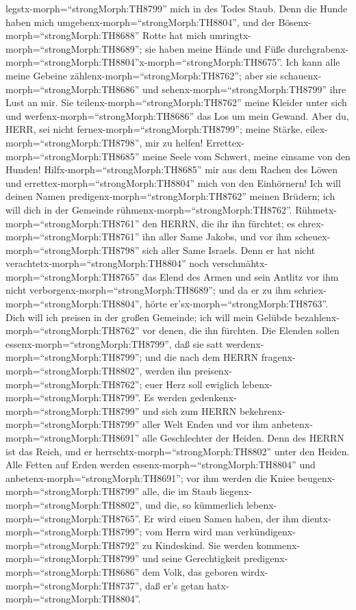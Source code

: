 legstx-morph=``strongMorph:TH8799'' mich in des Todes Staub.
 Denn die Hunde haben mich
umgebenx-morph=``strongMorph:TH8804'', und der
Bösenx-morph=``strongMorph:TH8688'' Rotte hat mich
umringtx-morph=``strongMorph:TH8689''; sie haben meine Hände und Füße
durchgrabenx-morph=``strongMorph:TH8804''\textbar x-morph=``strongMorph:TH8675''.
 Ich kann alle meine Gebeine
zählenx-morph=``strongMorph:TH8762''; aber sie
schauenx-morph=``strongMorph:TH8686'' und
sehenx-morph=``strongMorph:TH8799'' ihre Lust an mir.  Sie
teilenx-morph=``strongMorph:TH8762'' meine Kleider unter sich und
werfenx-morph=``strongMorph:TH8686'' das Los um mein Gewand.
 Aber du, HERR, sei nicht
fernex-morph=``strongMorph:TH8799''; meine Stärke,
eilex-morph=``strongMorph:TH8798'', mir zu helfen! 
Errettex-morph=``strongMorph:TH8685'' meine Seele vom Schwert, meine
einsame von den Hunden!  Hilfx-morph=``strongMorph:TH8685''
mir aus dem Rachen des Löwen und errettex-morph=``strongMorph:TH8804''
mich von den Einhörnern!  Ich will deinen Namen
predigenx-morph=``strongMorph:TH8762'' meinen Brüdern; ich will dich in
der Gemeinde rühmenx-morph=``strongMorph:TH8762''. 
Rühmetx-morph=``strongMorph:TH8761'' den HERRN, die ihr ihn fürchtet; es
ehrex-morph=``strongMorph:TH8761'' ihn aller Same Jakobs, und vor ihm
scheuex-morph=``strongMorph:TH8798'' sich aller Same Israels.
 Denn er hat nicht verachtetx-morph=``strongMorph:TH8804''
noch verschmähtx-morph=``strongMorph:TH8765'' das Elend des Armen und
sein Antlitz vor ihm nicht verborgenx-morph=``strongMorph:TH8689''; und
da er zu ihm schriex-morph=``strongMorph:TH8804'', hörte
er'sx-morph=``strongMorph:TH8763''.  Dich will ich preisen
in der großen Gemeinde; ich will mein Gelübde
bezahlenx-morph=``strongMorph:TH8762'' vor denen, die ihn fürchten.
 Die Elenden sollen essenx-morph=``strongMorph:TH8799'',
daß sie satt werdenx-morph=``strongMorph:TH8799''; und die nach dem
HERRN fragenx-morph=``strongMorph:TH8802'', werden ihn
preisenx-morph=``strongMorph:TH8762''; euer Herz soll ewiglich
lebenx-morph=``strongMorph:TH8799''.  Es werden
gedenkenx-morph=``strongMorph:TH8799'' und sich zum HERRN
bekehrenx-morph=``strongMorph:TH8799'' aller Welt Enden und vor ihm
anbetenx-morph=``strongMorph:TH8691'' alle Geschlechter der Heiden.
 Denn des HERRN ist das Reich, und er
herrschtx-morph=``strongMorph:TH8802'' unter den Heiden. 
Alle Fetten auf Erden werden essenx-morph=``strongMorph:TH8804'' und
anbetenx-morph=``strongMorph:TH8691''; vor ihm werden die Kniee
beugenx-morph=``strongMorph:TH8799'' alle, die im Staub
liegenx-morph=``strongMorph:TH8802'', und die, so kümmerlich
lebenx-morph=``strongMorph:TH8765''.  Er wird einen Samen
haben, der ihm dientx-morph=``strongMorph:TH8799''; vom Herrn wird man
verkündigenx-morph=``strongMorph:TH8792'' zu Kindeskind. 
Sie werden kommenx-morph=``strongMorph:TH8799'' und seine Gerechtigkeit
predigenx-morph=``strongMorph:TH8686'' dem Volk, das geboren
wirdx-morph=``strongMorph:TH8737'', daß er's getan
hatx-morph=``strongMorph:TH8804''.

